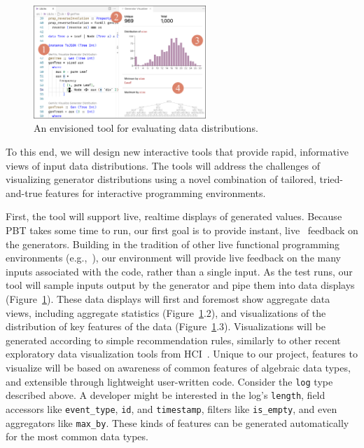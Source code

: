 \begin{figure}
  \centering
  \includegraphics[width=0.58\textwidth]{assets/gen-vis.pdf}
  \caption{An envisioned tool for evaluating data distributions.}\label{fig:gen-vis}
\end{figure}

To this end, we will design new interactive tools that provide rapid,
informative views of input data distributions. The tools will address the
challenges of visualizing generator distributions using a novel combination of
tailored, tried-and-true features for interactive programming environments.

First, the tool will support live, realtime displays of generated values.
Because PBT takes some time to run, our first goal is to provide
instant, live~\cite{ref:tanimoto1990viva} feedback on the generators. Building
in the tradition of other live functional programming environments
(e.g.,~\cite{tool:lighttable,ref:omar2019live}), our environment will provide
live feedback on the many inputs associated with the code, rather than a single
input. As the test runs, our tool will sample inputs output by the generator and
pipe them into data displays (Figure~\ref{fig:gen-vis}). These data displays
will first and foremost show aggregate data views, including aggregate
statistics (Figure~\ref{fig:gen-vis}.2), and visualizations of the distribution
of key features of the data (Figure~\ref{fig:gen-vis}.3). Visualizations will be
generated according to simple recommendation rules, similarly to other recent
exploratory data visualization tools from
HCI~\cite{ref:lee2021lux,wongsuphasawat_voyager_2016,
wongsuphasawat_voyager_2017}. Unique to our project, features to visualize will
be based on awareness of common features of algebraic data types, and extensible
through lightweight user-written code. Consider the \lstinline{log} type
described above. A developer might be interested in the log's
\lstinline{length}, field accessors like \lstinline{event_type}, \lstinline{id},
and \lstinline{timestamp}, filters like \lstinline{is_empty}, and even
aggregators like \lstinline{max_by}. These kinds of features can be generated
automatically for the most common data types.

